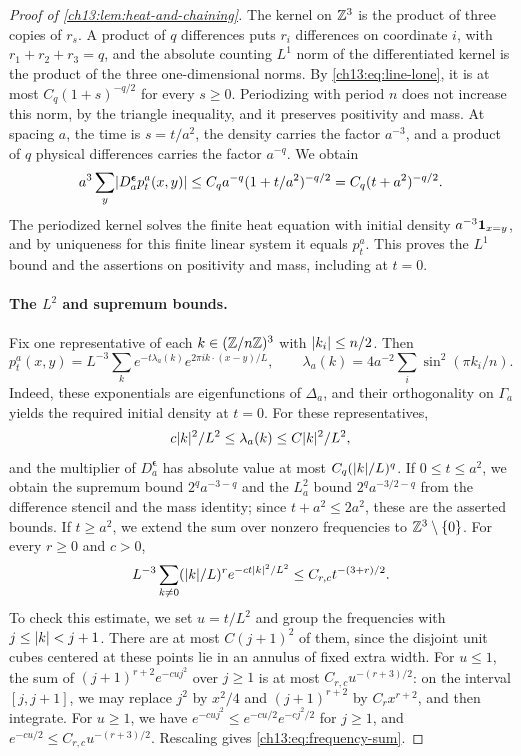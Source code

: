 \begin{proof}[Proof of \cref{ch13:lem:heat-and-chaining}]
The kernel on $\mathbb Z^3$ is the product of three copies of $r_s$. A product of $q$ differences puts $r_i$ differences on coordinate $i$, with $r_1+r_2+r_3=q$, and the absolute counting $L^1$ norm of the differentiated kernel is the product of the three one-dimensional norms. By \eqref{ch13:eq:line-lone}, it is at most $C_q(1+s)^{-q/2}$ for every $s\ge0$. Periodizing with period $n$ does not increase this norm, by the triangle inequality, and it preserves positivity and mass. At spacing $a$, the time is $s=t/a^2$, the density carries the factor $a^{-3}$, and a product of $q$ physical differences carries the factor $a^{-q}$. We obtain
\[
 a^3\sum_y\lvert D_a^{\boldsymbol\epsilon}p_t^a(x,y)\rvert\le C_qa^{-q}(1+t/a^2)^{-q/2}=C_q(t+a^2)^{-q/2}.
\]
The periodized kernel solves the finite heat equation with initial density $a^{-3}\mathbf 1_{x=y}$, and by uniqueness for this finite linear system it equals $p_t^a$. This proves the $L^1$ bound and the assertions on positivity and mass, including at $t=0$.

\paragraph{The $L^2$ and supremum bounds.}
Fix one representative of each $k\in(\mathbb Z/n\mathbb Z)^3$ with $\lvert k_i\rvert\le n/2$. Then
\begin{equation}\label{ch13:eq:finite-heat-fourier}
 p_t^a(x,y)=L^{-3}\sum_ke^{-t\lambda_a(k)}e^{2\pi ik\cdot(x-y)/L},\qquad
 \lambda_a(k)=4a^{-2}\sum_i\sin^2(\pi k_i/n).
\end{equation}
Indeed, these exponentials are eigenfunctions of $\Delta_a$, and their orthogonality on $\Gamma_a$ yields the required initial density at $t=0$. For these representatives,
\[
 c\lvert k\rvert^2/L^2\le\lambda_a(k)\le C\lvert k\rvert^2/L^2,
\]
and the multiplier of $D_a^{\boldsymbol\epsilon}$ has absolute value at most $C_q(\lvert k\rvert/L)^q$. If $0\le t\le a^2$, we obtain the supremum bound $2^qa^{-3-q}$ and the $L^2_a$ bound $2^qa^{-3/2-q}$ from the difference stencil and the mass identity; since $t+a^2\le2a^2$, these are the asserted bounds. If $t\ge a^2$, we extend the sum over nonzero frequencies to $\mathbb Z^3\setminus\{0\}$. For every $r\ge0$ and $c>0$,
\begin{equation}\label{ch13:eq:frequency-sum}
 L^{-3}\sum_{k\ne0}(\lvert k\rvert/L)^re^{-ct\lvert k\rvert^2/L^2}\le C_{r,c}t^{-(3+r)/2}.
\end{equation}
To check this estimate, we set $u=t/L^2$ and group the frequencies with $j\le\lvert k\rvert<j+1$. There are at most $C(j+1)^2$ of them, since the disjoint unit cubes centered at these points lie in an annulus of fixed extra width. For $u\le1$, the sum of $(j+1)^{r+2}e^{-cuj^2}$ over $j\ge1$ is at most $C_{r,c}u^{-(r+3)/2}$: on the interval $[j,j+1]$, we may replace $j^2$ by $x^2/4$ and $(j+1)^{r+2}$ by $C_rx^{r+2}$, and then integrate. For $u\ge1$, we have $e^{-cuj^2}\le e^{-cu/2}e^{-cj^2/2}$ for $j\ge1$, and $e^{-cu/2}\le C_{r,c}u^{-(r+3)/2}$. Rescaling gives \eqref{ch13:eq:frequency-sum}.


\end{proof}
